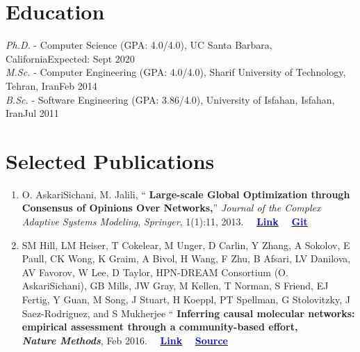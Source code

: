 \documentclass[letter]{res}
\begin{document}
	\newif \iflong
	\longfalse     %
	
	\address{+1 (805) 886 7101 ~~~ 6520 El Colegio Rd, Apt 2308, Santa Barbara, CA 93106. ~ \href{mailto:omid55@cs.ucsb.edu}{omid55@cs.ucsb.edu} ~ \href{https://scholar.google.com/citations?user=pwzmHkQAAAAJ}{GoogleScholar} ~ \href{https://www.linkedin.com/in/omid-askarisichani-07bb5230}{LinkedIn}}
	\begin{resume}
		\noindent\makebox[\linewidth]{\rule{\paperwidth}{0.4pt}}
		
		\section{Education}
		{\sl Ph.D.} - Computer Science (GPA: 4.0/4.0), UC Santa Barbara, California\hfill Expected: Sept 2020\vspace{-1mm}\\
		{\sl M.Sc.} - Computer Engineering (GPA: 4.0/4.0), Sharif University of Technology, Tehran, Iran\hfill Feb 2014\vspace{-1mm}\\
		{\sl B.Sc.} - Software Engineering (GPA: 3.86/4.0), University of Isfahan, Isfahan, Iran\hfill Jul 2011\vspace{-1mm}
		
		\section{Selected Publications}
		\begin{enumerate}[leftmargin=-.01in]
			\item O. AskariSichani, M. Jalili, `` \textbf{Large-scale Global
				Optimization through Consensus of Opinions Over Networks,}'' \textit{Journal of the Complex Adaptive Systems Modeling}, \textit{Springer}, 1(1):11, 2013.
			~~\href{http://www.casmodeling.com/content/1/1/11}{\textbf{\textcolor{blue}{Link}}}
			~~\href{https://github.com/omid55/optimization_opinion_formation}{\textbf{\textcolor{blue}{Git}}}
			
			\item SM Hill, LM Heiser, T Cokelear, M Unger, D Carlin, Y Zhang, A Sokolov, E Paull, CK Wong, K Graim, A Bivol, H Wang, F Zhu, B Afsari, LV Danilova, AV Favorov, W Lee, D Taylor, HPN-DREAM Consortium (O. AskariSichani), GB Mills, JW Gray, M Kellen, T Norman, S Friend, EJ Fertig, Y Guan, M Song, J Stuart, H Koeppl, PT Spellman, G Stolovitzky, J Saez-Rodriguez, and S Mukherjee `` \textbf{Inferring causal molecular networks: empirical assessment through a community-based effort,}\\ \textbf{\textit{Nature Methods}}, Feb 2016.
			~~\href{http://www.nature.com/nmeth/journal/vaop/ncurrent/full/nmeth.3773.html}{\textbf{\textcolor{blue}{Link}}}
			~~\href{https://github.com/omid55/nature_causal_network}{\textbf{\textcolor{blue}{Source}}}
			

\end{enumerate}
\end{resume}
\end{document}
